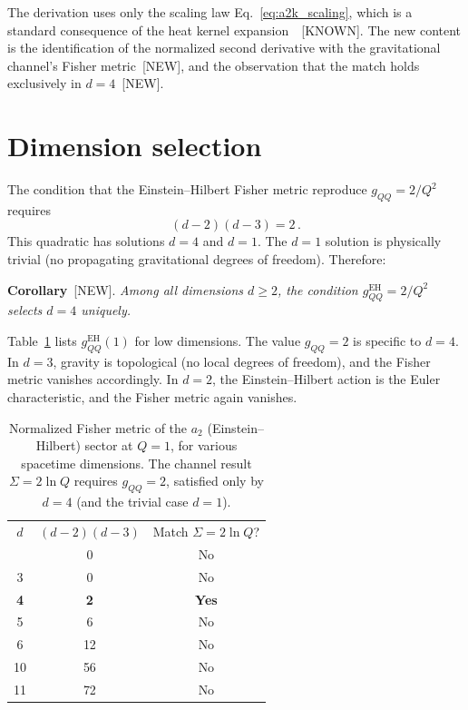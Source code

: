 \documentclass[prl,twocolumn,superscriptaddress,longbibliography]{revtex4-2}
\begin{document}
The derivation uses only the scaling law
Eq.~\eqref{eq:a2k_scaling}, which is
a standard consequence of the heat kernel
expansion~\cite{Vassilevich2003,Gilkey1995}~[KNOWN].
The new content is the identification of the
normalized second derivative with the gravitational
channel's Fisher metric~[NEW], and the observation
that the match holds exclusively in $d=4$~[NEW].


\section{Dimension selection}
\label{sec:dimension}

The condition that the Einstein--Hilbert Fisher
metric reproduce $g_{QQ} = 2/Q^2$ requires
\begin{equation}\label{eq:d_selection}
  (d-2)(d-3) = 2\,.
\end{equation}
This quadratic has solutions $d = 4$ and $d = 1$.
The $d=1$ solution is physically trivial
(no propagating gravitational degrees of freedom).
Therefore:

\medskip
\noindent\textbf{Corollary}~[NEW].
\emph{Among all dimensions $d \geq 2$, the
condition $g_{QQ}^{\mathrm{EH}} = 2/Q^2$ selects
$d=4$ uniquely.}

\medskip
Table~\ref{tab:dimensions} lists
$g_{QQ}^{\mathrm{EH}}(1)$ for low dimensions.
The value $g_{QQ} = 2$ is specific to $d=4$.
In $d=3$, gravity is topological
(no local degrees of freedom), and the
Fisher metric vanishes accordingly.
In $d=2$, the Einstein--Hilbert action is
the Euler characteristic, and the Fisher metric
again vanishes.

\begin{table}[t]
\centering
\caption{Normalized Fisher metric of the $a_2$
(Einstein--Hilbert) sector at $Q=1$, for
various spacetime dimensions.
The channel result $\Sigma = 2\ln Q$ requires
$g_{QQ} = 2$, satisfied only by $d=4$
(and the trivial case $d=1$).}
\label{tab:dimensions}
\begin{ruledtabular}
\begin{tabular}{ccc}
$d$ & $(d-2)(d-3)$ & Match $\Sigma = 2\ln Q$?\\
\colrule
2 & 0 & No \\
3 & 0 & No \\
\textbf{4} & \textbf{2} & \textbf{Yes} \\
5 & 6 & No \\
6 & 12 & No \\
10 & 56 & No \\
11 & 72 & No \\
\end{tabular}
\end{ruledtabular}
\end{table}
\end{document}
